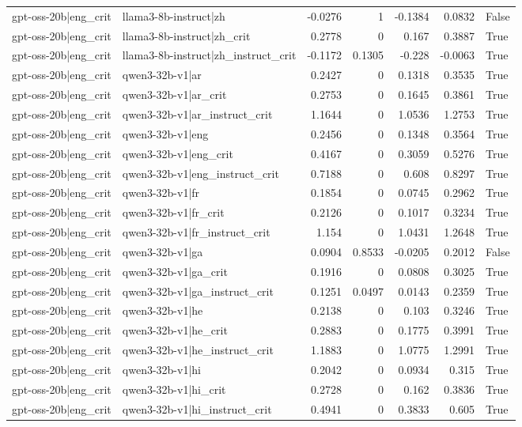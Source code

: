 \begin{table}
\begin{tabular}{l l r r r r l}
gpt-oss-20b|eng_crit & llama3-8b-instruct|zh & -0.0276 & 1 & -0.1384 & 0.0832 & False \\
gpt-oss-20b|eng_crit & llama3-8b-instruct|zh_crit & 0.2778 & 0 & 0.167 & 0.3887 & True \\
gpt-oss-20b|eng_crit & llama3-8b-instruct|zh_instruct_crit & -0.1172 & 0.1305 & -0.228 & -0.0063 & True \\
gpt-oss-20b|eng_crit & qwen3-32b-v1|ar & 0.2427 & 0 & 0.1318 & 0.3535 & True \\
gpt-oss-20b|eng_crit & qwen3-32b-v1|ar_crit & 0.2753 & 0 & 0.1645 & 0.3861 & True \\
gpt-oss-20b|eng_crit & qwen3-32b-v1|ar_instruct_crit & 1.1644 & 0 & 1.0536 & 1.2753 & True \\
gpt-oss-20b|eng_crit & qwen3-32b-v1|eng & 0.2456 & 0 & 0.1348 & 0.3564 & True \\
gpt-oss-20b|eng_crit & qwen3-32b-v1|eng_crit & 0.4167 & 0 & 0.3059 & 0.5276 & True \\
gpt-oss-20b|eng_crit & qwen3-32b-v1|eng_instruct_crit & 0.7188 & 0 & 0.608 & 0.8297 & True \\
gpt-oss-20b|eng_crit & qwen3-32b-v1|fr & 0.1854 & 0 & 0.0745 & 0.2962 & True \\
gpt-oss-20b|eng_crit & qwen3-32b-v1|fr_crit & 0.2126 & 0 & 0.1017 & 0.3234 & True \\
gpt-oss-20b|eng_crit & qwen3-32b-v1|fr_instruct_crit & 1.154 & 0 & 1.0431 & 1.2648 & True \\
gpt-oss-20b|eng_crit & qwen3-32b-v1|ga & 0.0904 & 0.8533 & -0.0205 & 0.2012 & False \\
gpt-oss-20b|eng_crit & qwen3-32b-v1|ga_crit & 0.1916 & 0 & 0.0808 & 0.3025 & True \\
gpt-oss-20b|eng_crit & qwen3-32b-v1|ga_instruct_crit & 0.1251 & 0.0497 & 0.0143 & 0.2359 & True \\
gpt-oss-20b|eng_crit & qwen3-32b-v1|he & 0.2138 & 0 & 0.103 & 0.3246 & True \\
gpt-oss-20b|eng_crit & qwen3-32b-v1|he_crit & 0.2883 & 0 & 0.1775 & 0.3991 & True \\
gpt-oss-20b|eng_crit & qwen3-32b-v1|he_instruct_crit & 1.1883 & 0 & 1.0775 & 1.2991 & True \\
gpt-oss-20b|eng_crit & qwen3-32b-v1|hi & 0.2042 & 0 & 0.0934 & 0.315 & True \\
gpt-oss-20b|eng_crit & qwen3-32b-v1|hi_crit & 0.2728 & 0 & 0.162 & 0.3836 & True \\
gpt-oss-20b|eng_crit & qwen3-32b-v1|hi_instruct_crit & 0.4941 & 0 & 0.3833 & 0.605 & True \\

\end{tabular}
\end{table}
